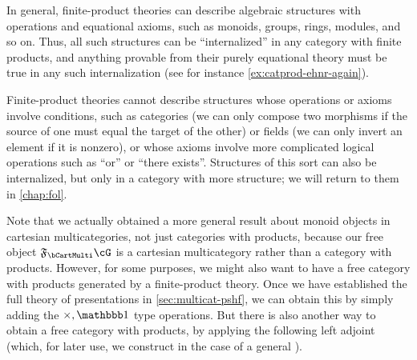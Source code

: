 In general, finite-product theories can describe algebraic structures with operations and equational axioms, such as monoids, groups, rings, modules, and so on.
Thus, all such structures can be ``internalized'' in any category with finite products, and anything provable from their purely equational theory must be true in any such internalization (see for instance \cref{ex:catprod-ehnr-again}).

Finite-product theories cannot describe structures whose operations or axioms involve conditions, such as categories (we can only compose two morphisms if the source of one must equal the target of the other) or fields (we can only invert an element if it is nonzero), or whose axioms involve more complicated logical operations such as ``or'' or ``there exists''.
Structures of this sort can also be internalized, but only in a category with more structure; we will return to them in \cref{chap:fol}.

Note that we actually obtained a more general result about monoid objects in cartesian multicategories, not just categories with products, because our free object $\F\bCartMulti\cG$ is a cartesian multicategory rather than a category with products.
However, for some purposes, we might also want to have a free category with products generated by a finite-product theory.
Once we have established the full theory of presentations in \cref{sec:multicat-pshf}, we can obtain this by simply adding the $\times,\unit$ type operations.
But there is also another way to obtain a free category with products, by applying the following left adjoint (which, for later use, we construct in the case of a general \fS).

